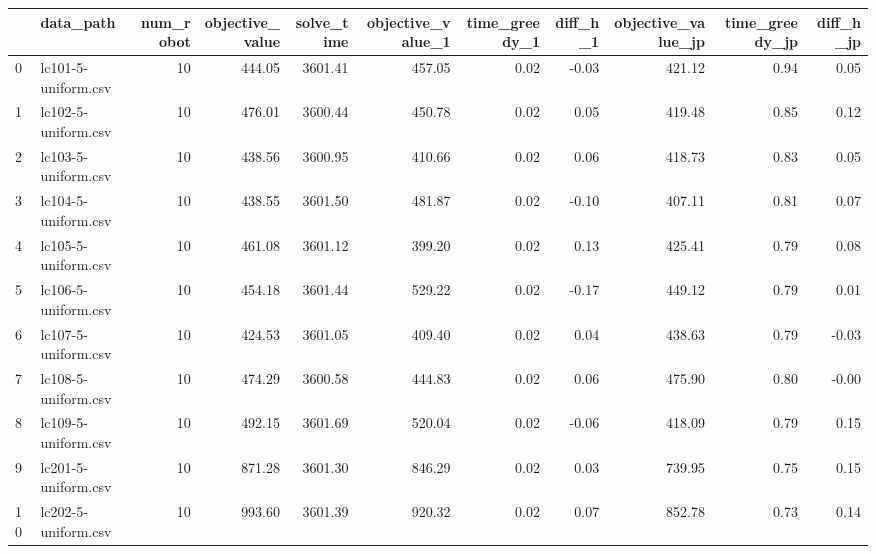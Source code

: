\begin{tabular}{llrrrrrrrrr}
\toprule
{} &             data\_path &  num\_robot &  objective\_value &  solve\_time &  objective\_value\_1 &  time\_greedy\_1 &  diff\_h\_1 &  objective\_value\_jp &  time\_greedy\_jp &  diff\_h\_jp \\
\midrule
0  &   lc101-5-uniform.csv &         10 &           444.05 &     3601.41 &             457.05 &           0.02 &     -0.03 &              421.12 &            0.94 &       0.05 \\
1  &   lc102-5-uniform.csv &         10 &           476.01 &     3600.44 &             450.78 &           0.02 &      0.05 &              419.48 &            0.85 &       0.12 \\
2  &   lc103-5-uniform.csv &         10 &           438.56 &     3600.95 &             410.66 &           0.02 &      0.06 &              418.73 &            0.83 &       0.05 \\
3  &   lc104-5-uniform.csv &         10 &           438.55 &     3601.50 &             481.87 &           0.02 &     -0.10 &              407.11 &            0.81 &       0.07 \\
4  &   lc105-5-uniform.csv &         10 &           461.08 &     3601.12 &             399.20 &           0.02 &      0.13 &              425.41 &            0.79 &       0.08 \\
5  &   lc106-5-uniform.csv &         10 &           454.18 &     3601.44 &             529.22 &           0.02 &     -0.17 &              449.12 &            0.79 &       0.01 \\
6  &   lc107-5-uniform.csv &         10 &           424.53 &     3601.05 &             409.40 &           0.02 &      0.04 &              438.63 &            0.79 &      -0.03 \\
7  &   lc108-5-uniform.csv &         10 &           474.29 &     3600.58 &             444.83 &           0.02 &      0.06 &              475.90 &            0.80 &      -0.00 \\
8  &   lc109-5-uniform.csv &         10 &           492.15 &     3601.69 &             520.04 &           0.02 &     -0.06 &              418.09 &            0.79 &       0.15 \\
9  &   lc201-5-uniform.csv &         10 &           871.28 &     3601.30 &             846.29 &           0.02 &      0.03 &              739.95 &            0.75 &       0.15 \\
10 &   lc202-5-uniform.csv &         10 &           993.60 &     3601.39 &             920.32 &           0.02 &      0.07 &              852.78 &            0.73 &       0.14 \\

\end{tabular}
